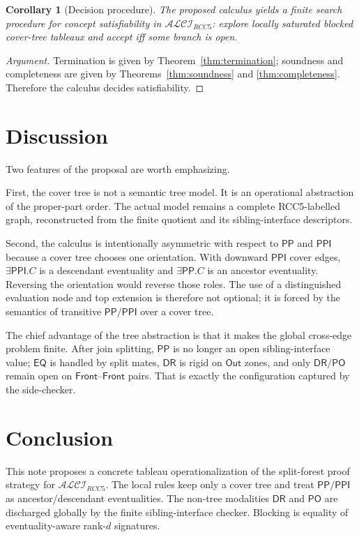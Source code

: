 \documentclass[11pt]{article}
\newtheorem{corollary}[definition]{Corollary}
\theoremstyle{remark}
\newcommand{\DR}{\mathsf{DR}}
\newcommand{\PO}{\mathsf{PO}}
\newcommand{\PP}{\mathsf{PP}}
\newcommand{\PPI}{\mathsf{PPI}}
\newcommand{\EQ}{\mathsf{EQ}}
\newcommand{\Out}{\mathsf{Out}}
\newcommand{\Front}{\mathsf{Front}}
\begin{document}
\begin{corollary}[Decision procedure]\label{cor:decision-procedure}
The proposed calculus yields a finite search procedure for concept satisfiability in $\mathcal{ALCI}_{RCC5}$: explore locally saturated blocked cover-tree tableaux and accept iff some branch is open.
\end{corollary}

\begin{proof}[Argument]
Termination is given by Theorem~\ref{thm:termination}; soundness and completeness are given by Theorems~\ref{thm:soundness} and \ref{thm:completeness}. Therefore the calculus decides satisfiability.
\end{proof}

\section{Discussion}

Two features of the proposal are worth emphasizing.

First, the cover tree is not a semantic tree model. It is an operational abstraction of the proper-part order. The actual model remains a complete RCC5-labelled graph, reconstructed from the finite quotient and its sibling-interface descriptors.

Second, the calculus is intentionally asymmetric with respect to $\PP$ and $\PPI$ because a cover tree chooses one orientation. With downward $\PPI$ cover edges, $\exists\PPI.C$ is a descendant eventuality and $\exists\PP.C$ is an ancestor eventuality. Reversing the orientation would reverse those roles. The use of a distinguished evaluation node and top extension is therefore not optional; it is forced by the semantics of transitive $\PP/\PPI$ over a cover tree.

The chief advantage of the tree abstraction is that it makes the global cross-edge problem finite. After join splitting, $\PP$ is no longer an open sibling-interface value; $\EQ$ is handled by split mates, $\DR$ is rigid on $\Out$ zones, and only $\DR/\PO$ remain open on $\Front$--$\Front$ pairs. That is exactly the configuration captured by the side-checker.

\section{Conclusion}

This note proposes a concrete tableau operationalization of the split-forest proof strategy for $\mathcal{ALCI}_{RCC5}$. The local rules keep only a cover tree and treat $\PP/\PPI$ as ancestor/descendant eventualities. The non-tree modalities $\DR$ and $\PO$ are discharged globally by the finite sibling-interface checker. Blocking is equality of eventuality-aware rank-$d$ signatures.
\end{document}
